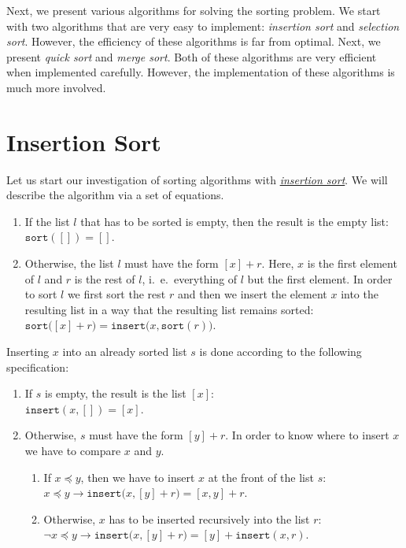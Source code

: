Next, we present various algorithms for solving the sorting problem.  We start with two algorithms
that are very easy to implement: \emph{insertion sort} and \emph{selection sort}.  However, the
efficiency of these algorithms is far from optimal.  Next, we present \emph{quick sort} and 
\emph{merge sort}.  Both of these algorithms are very efficient when implemented carefully.
However, the implementation of these algorithms is much more involved.


\section{Insertion Sort}
Let us start our investigation of sorting algorithms with
\href{http://en.wikipedia.org/wiki/Insertion_sort}{\emph{insertion sort}}.  We will describe the
algorithm via a set of equations.
\begin{enumerate}
\item If the list $l$ that has to be sorted is empty, then the result is the empty list: 
      \\[0.2cm]
      \hspace*{1.3cm}
      $\mathtt{sort}([]) = []$.
\item Otherwise, the list $l$ must have the form $[x] + r$. Here, $x$ is the first element of $l$
      and $r$ is the rest of $l$, i.~e.~everything of $l$ but the first element.  In order to sort
      $l$ we first sort the rest $r$ and then we insert the element $x$ into the resulting list in a
      way that the resulting list remains sorted:
      \\[0.2cm]
      \hspace*{1.3cm} $\mathtt{sort}\bigl([x] + r\bigr) = \mathtt{insert}\bigl(x, \mathtt{sort}(r)\bigr)$.
\end{enumerate}
Inserting $x$ into an already sorted list $s$ is done according to the following specification:
\begin{enumerate}
\item If $s$ is empty, the result is the list $[x]$: \\[0.2cm]
      \hspace*{1.3cm}
      $\mathtt{insert}(x,[]) = [x]$.
\item Otherwise, $s$ must have the form $[y] + r$.  In order to know where to insert $x$ we have to
      compare $x$ and $y$.
      \begin{enumerate}
      \item If $x \preceq y$, then we have to insert $x$ at the front of the list $s$: \\[0.2cm]
            \hspace*{1.3cm}
            $x \preceq y \rightarrow \mathtt{insert}\bigl(x, [y] + r\bigr) = [x,y] + r$. 
      \item Otherwise, $x$ has to be inserted recursively into the list $r$: \\[0.2cm]
            \hspace*{1.3cm}
            $\neg x \preceq y \rightarrow \mathtt{insert}\bigl(x, [y] + r\bigr) = [y] + \mathtt{insert}(x,r)$. 
      \end{enumerate}
\end{enumerate}

